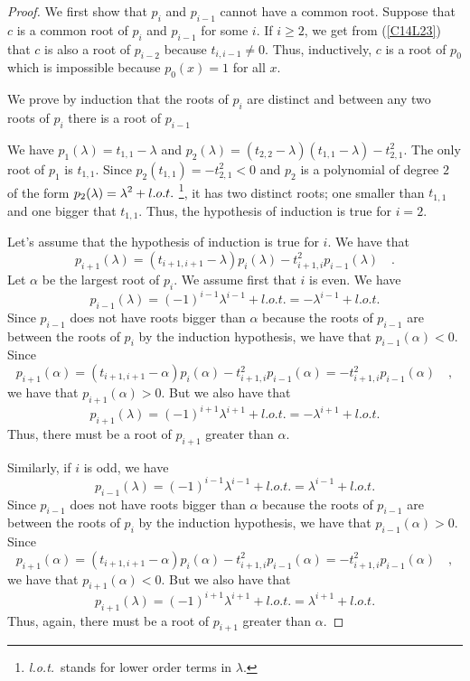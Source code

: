 \begin{proof}
 We first show that $p_i$ and $p_{i-1}$ cannot have a common
root.  Suppose that $c$ is a common root of $p_i$ and $p_{i-1}$ for
some $i$.  If $i\geq 2$, we get from (\ref{C14L23}) that $c$ is
also a root of $p_{i-2}$ because $t_{i,i-1} \neq 0$.  Thus,
inductively, $c$ is a root of $p_0$ which is impossible because
$p_0(x) = 1$ for all $x$.

 We prove by induction that the roots of $p_i$ are distinct
and between any two roots of $p_i$ there is a root of $p_{i-1}$

We have $p_1(\lambda) = t_{1,1} - \lambda$ and
$p_2(\lambda) = (t_{2,2}-\lambda)(t_{1,1}-\lambda) - t_{2,1}^2$.
The only root of $p_1$ is $t_{1,1}$.  Since
$p_2(t_{1,1}) = - t_{2,1}^2 < 0$ and $p_2$ is a polynomial of degree
$2$ of the form $\displaystyle p_2(\lambda) = \lambda^2 + l.o.t.$
\footnote{{\it l.o.t.}\ stands for lower order terms in $\lambda$.},
it has two distinct roots;
one smaller than $t_{1,1}$ and one bigger that $t_{1,1}$.   Thus, the
hypothesis of induction is true for $i=2$.

Let's assume that the hypothesis of induction is true for $i$.  We
have that
\[
  p_{i+1}(\lambda) = (t_{i+1,i+1}-\lambda) p_i(\lambda)
  - t_{i+1,i}^2 p_{i-1}(\lambda) \quad .
\]
Let $\alpha$ be the largest root of $p_i$.  We assume first that $i$
is even.  We have
\[
  p_{i-1}(\lambda) = (-1)^{i-1}\lambda^{i-1} + l.o.t.
  = - \lambda^{i-1} + l.o.t.
\]
Since $p_{i-1}$ does not have roots bigger than $\alpha$ because the
roots of $p_{i-1}$ are between the roots of $p_i$ by the induction
hypothesis, we have that $p_{i-1}(\alpha)< 0$.
Since
\[
  p_{i+1}(\alpha) = (t_{i+1,i+1}-\alpha) p_i(\alpha)
  - t_{i+1,i}^2 p_{i-1}(\alpha) = - t_{i+1,i}^2 p_{i-1}(\alpha) \quad ,
\]
we have that $p_{i+1}(\alpha)> 0$.  But we also have that
\[
  p_{i+1}(\lambda) = (-1)^{i+1}\lambda^{i+1} + l.o.t.
  = - \lambda^{i+1} + l.o.t.
\]
Thus, there must be a root of $p_{i+1}$ greater than $\alpha$.

Similarly, if $i$ is odd, we have
\[
  p_{i-1}(\lambda) = (-1)^{i-1}\lambda^{i-1} + l.o.t.
  = \lambda^{i-1} + l.o.t.
\]
Since $p_{i-1}$ does not have roots bigger than $\alpha$ because the
roots of $p_{i-1}$ are between the roots of $p_i$ by the induction
hypothesis, we have that $p_{i-1}(\alpha)> 0$.
Since
\[
  p_{i+1}(\alpha) = (t_{i+1,i+1}-\alpha) p_i(\alpha)
  - t_{i+1,i}^2 p_{i-1}(\alpha) = - t_{i+1,i}^2 p_{i-1}(\alpha) \quad ,
\]
we have that $p_{i+1}(\alpha)< 0$.  But we also have that
\[
  p_{i+1}(\lambda) = (-1)^{i+1}\lambda^{i+1} + l.o.t.
  = \lambda^{i+1} + l.o.t.
\]
Thus, again, there must be a root of $p_{i+1}$ greater than $\alpha$.


\end{proof}
